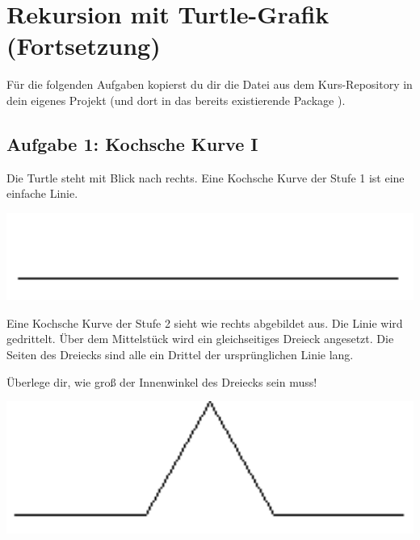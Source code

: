 \section{Rekursion mit Turtle-Grafik (Fortsetzung)}

Für die folgenden Aufgaben kopierst du dir die Datei
 aus dem Kurs-Repository in dein eigenes Projekt (und
dort in das bereits existierende Package ).

\subsection{Aufgabe 1: Kochsche Kurve I}

\begin{minipage}{0.55\textwidth}
Die Turtle steht mit Blick nach rechts. Eine  Kochsche Kurve der Stufe 1 ist
eine einfache Linie.
\end{minipage}\hfill
\begin{minipage}{0.4\textwidth}
  \centering
  \includegraphics[width=1.0\textwidth]{./inf/SEKII/06_Java_Rekursion/Aufgabe3_1-1.png}
\end{minipage}

\begin{minipage}{0.55\textwidth}
Eine Kochsche Kurve der Stufe 2 sieht wie rechts abgebildet aus. Die Linie wird
gedrittelt. Über dem Mittelstück wird ein gleichseitiges Dreieck angesetzt. Die
Seiten des Dreiecks sind alle ein Drittel der ursprünglichen Linie lang.

Überlege dir, wie groß der Innenwinkel des Dreiecks sein muss!
\end{minipage}\hfill
\begin{minipage}{0.4\textwidth}
  \centering
  \includegraphics[width=1.0\textwidth]{./inf/SEKII/06_Java_Rekursion/Aufgabe3_1-2.png}
\end{minipage}

